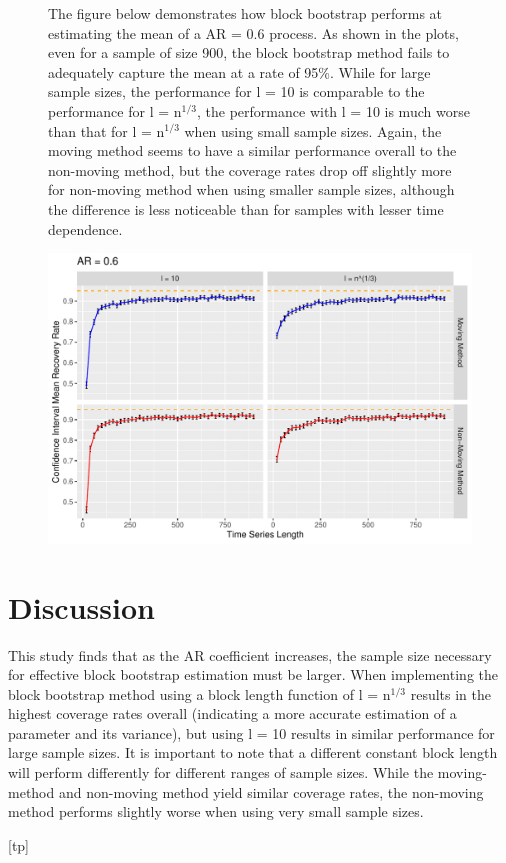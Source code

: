 \documentclass[12pt, letterpaper, titlepage]{article}
\begin{document}
\begin{figure}[tbp]
\caption{The figure below demonstrates how block bootstrap performs at estimating the mean of a AR = 0.6 process. As shown in the plots, even for a sample of size 900, the block bootstrap method fails to adequately capture the mean at a rate of 95\%.  While for large sample sizes, the performance for l = 10 is comparable to the performance for l = n$^{1/3}$, the performance with l = 10 is much worse than that for l = n$^{1/3}$ when using small sample sizes. Again, the moving method seems to have a similar performance overall to the non-moving method, but the coverage rates drop off slightly more for non-moving method when using smaller sample sizes, although the difference is less noticeable than for samples with lesser time dependence.}
  \centering
  \includegraphics[width=\textwidth]{ar_0.6}
  \caption{}
  \label{fig:ar_0.6}
\end{figure}

\section{Discussion}
\label{sec:discuss}

This study finds that as the AR coefficient increases, the sample size necessary for effective block bootstrap estimation must be larger. When implementing the block bootstrap method using a block length function of l = n$^{1/3}$ results in the highest coverage rates overall (indicating a more accurate estimation of a parameter and its variance), but using l = 10 results in similar performance for large sample sizes. It is important to note that a different constant block length will perform differently for different ranges of sample sizes. While the moving-method and non-moving method yield similar coverage rates, the non-moving method performs slightly worse when using very small sample sizes.




[tp]
\end{document}
